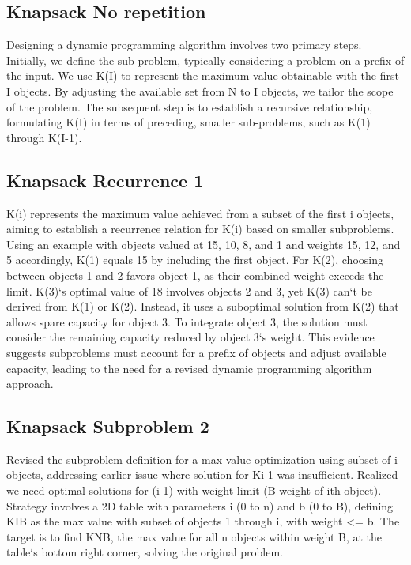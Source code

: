 \subsection*{Knapsack  No repetition}
Designing a dynamic programming algorithm involves two primary steps.
Initially, we define the sub-problem, typically considering a problem on a prefix of the input.
We use K(I) to represent the maximum value obtainable with the first I objects.
By adjusting the available set from N to I objects, we tailor the scope of the problem.
The subsequent step is to establish a recursive relationship, formulating K(I) in terms of preceding, smaller sub-problems, such as K(1) through K(I-1).

\subsection*{Knapsack  Recurrence 1}
K(i) represents the maximum value achieved from a subset of the first i objects, aiming to establish a recurrence relation for K(i) based on smaller subproblems.
Using an example with objects valued at 15, 10, 8, and 1 and weights 15, 12, and 5 accordingly, K(1) equals 15 by including the first object.
For K(2), choosing between objects 1 and 2 favors object 1, as their combined weight exceeds the limit.
K(3)`s optimal value of 18 involves objects 2 and 3, yet K(3) can`t be derived from K(1) or K(2).
Instead, it uses a suboptimal solution from K(2) that allows spare capacity for object 3.
To integrate object 3, the solution must consider the remaining capacity reduced by object 3`s weight.
This evidence suggests subproblems must account for a prefix of objects and adjust available capacity, leading to the need for a revised dynamic programming algorithm approach.

\subsection*{Knapsack  Subproblem 2}
Revised the subproblem definition for a max value optimization using subset of i objects, addressing earlier issue where solution for Ki-1 was insufficient.
Realized we need optimal solutions for (i-1) with weight limit (B-weight of ith object).
Strategy involves a 2D table with parameters i (0 to n) and b (0 to B), defining KIB as the max value with subset of objects 1 through i, with weight \textless{}= b.
The target is to find KNB, the max value for all n objects within weight B, at the table`s bottom right corner, solving the original problem.

